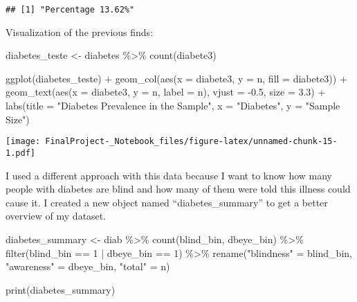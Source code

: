 \documentclass[
]{article}
\newenvironment{Shaded}{\begin{snugshade}}{\end{snugshade}}
\newcommand{\AttributeTok}[1]{\textcolor[rgb]{0.77,0.63,0.00}{#1}}
\newcommand{\DecValTok}[1]{\textcolor[rgb]{0.00,0.00,0.81}{#1}}
\newcommand{\FloatTok}[1]{\textcolor[rgb]{0.00,0.00,0.81}{#1}}
\newcommand{\FunctionTok}[1]{\textcolor[rgb]{0.00,0.00,0.00}{#1}}
\newcommand{\NormalTok}[1]{#1}
\newcommand{\OtherTok}[1]{\textcolor[rgb]{0.56,0.35,0.01}{#1}}
\newcommand{\SpecialCharTok}[1]{\textcolor[rgb]{0.00,0.00,0.00}{#1}}
\newcommand{\StringTok}[1]{\textcolor[rgb]{0.31,0.60,0.02}{#1}}
\begin{document}
\begin{verbatim}
## [1] "Percentage 13.62%"
\end{verbatim}

Visualization of the previous finds:

\begin{Shaded}
\begin{Highlighting}[]
\NormalTok{diabetes\_teste }\OtherTok{\textless{}{-}}\NormalTok{ diabetes }\SpecialCharTok{\%\textgreater{}\%} 
  \FunctionTok{count}\NormalTok{(diabete3)}

\FunctionTok{ggplot}\NormalTok{(diabetes\_teste) }\SpecialCharTok{+}
  \FunctionTok{geom\_col}\NormalTok{(}\FunctionTok{aes}\NormalTok{(}\AttributeTok{x =}\NormalTok{ diabete3, }\AttributeTok{y =}\NormalTok{ n, }\AttributeTok{fill =}\NormalTok{ diabete3)) }\SpecialCharTok{+}
  \FunctionTok{geom\_text}\NormalTok{(}\FunctionTok{aes}\NormalTok{(}\AttributeTok{x =}\NormalTok{ diabete3, }\AttributeTok{y =}\NormalTok{ n, }\AttributeTok{label =}\NormalTok{ n), }\AttributeTok{vjust =} \SpecialCharTok{{-}}\FloatTok{0.5}\NormalTok{, }\AttributeTok{size =} \FloatTok{3.3}\NormalTok{) }\SpecialCharTok{+}
  \FunctionTok{labs}\NormalTok{(}\AttributeTok{title =} \StringTok{"Diabetes Prevalence in the Sample"}\NormalTok{,}
      \AttributeTok{x =} \StringTok{"Diabetes"}\NormalTok{,}
      \AttributeTok{y =} \StringTok{"Sample Size"}\NormalTok{)}
\end{Highlighting}
\end{Shaded}

\texttt{[image: FinalProject-\_Notebook\_files/figure-latex/unnamed-chunk-15-1.pdf]}

I used a different approach with this data because I want to know how
many people with diabetes are blind and how many of them were told this
illness could cause it. I created a new object named
``diabetes\_summary'' to get a better overview of my dataset.

\begin{Shaded}
\begin{Highlighting}[]
\NormalTok{diabetes\_summary }\OtherTok{\textless{}{-}}\NormalTok{ diab }\SpecialCharTok{\%\textgreater{}\%} \FunctionTok{count}\NormalTok{(blind\_bin, dbeye\_bin) }\SpecialCharTok{\%\textgreater{}\%}
  \FunctionTok{filter}\NormalTok{(blind\_bin }\SpecialCharTok{==} \DecValTok{1} \SpecialCharTok{|}\NormalTok{ dbeye\_bin }\SpecialCharTok{==} \DecValTok{1}\NormalTok{) }\SpecialCharTok{\%\textgreater{}\%}
  \FunctionTok{rename}\NormalTok{(}\StringTok{"blindness"} \OtherTok{=}\NormalTok{ blind\_bin,}
        \StringTok{"awareness"} \OtherTok{=}\NormalTok{ dbeye\_bin,}
        \StringTok{"total"} \OtherTok{=}\NormalTok{ n) }
  

\FunctionTok{print}\NormalTok{(diabetes\_summary)}
\end{Highlighting}
\end{Shaded}
\end{document}
